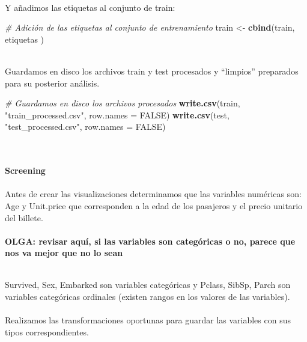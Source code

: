 \documentclass[
]{article}
\newenvironment{Shaded}{\begin{snugshade}}{\end{snugshade}}
\newcommand{\CommentTok}[1]{\textcolor[rgb]{0.56,0.35,0.01}{\textit{#1}}}
\newcommand{\DataTypeTok}[1]{\textcolor[rgb]{0.13,0.29,0.53}{#1}}
\newcommand{\KeywordTok}[1]{\textcolor[rgb]{0.13,0.29,0.53}{\textbf{#1}}}
\newcommand{\NormalTok}[1]{#1}
\newcommand{\OtherTok}[1]{\textcolor[rgb]{0.56,0.35,0.01}{#1}}
\newcommand{\StringTok}[1]{\textcolor[rgb]{0.31,0.60,0.02}{#1}}
\begin{document}
\texttt{}~\\
\texttt{}

Y añadimos las etiquetas al conjunto de train: \texttt{}

\begin{Shaded}
\begin{Highlighting}[]
\CommentTok{# Adición de las etiquetas al conjunto de entrenamiento}
\NormalTok{train <-}\StringTok{ }\KeywordTok{cbind}\NormalTok{(train, etiquetas )}
\end{Highlighting}
\end{Shaded}

\texttt{}\\
Guardamos en disco los archivos train y test procesados y ``limpios''
preparados para su posterior análisis. \texttt{}

\begin{Shaded}
\begin{Highlighting}[]
\CommentTok{# Guardamos en disco los archivos procesados}
\KeywordTok{write.csv}\NormalTok{(train, }\StringTok{"train_processed.csv"}\NormalTok{, }\DataTypeTok{row.names =} \OtherTok{FALSE}\NormalTok{)}
\KeywordTok{write.csv}\NormalTok{(test, }\StringTok{"test_processed.csv"}\NormalTok{, }\DataTypeTok{row.names =} \OtherTok{FALSE}\NormalTok{)}
\end{Highlighting}
\end{Shaded}

\texttt{}\\
\texttt{}~\\
\textbf{Screening}\\
\texttt{}~\\
Antes de crear las visualizaciones determinamos que las variables
numéricas son: Age y Unit.price que corresponden a la edad de los
pasajeros y el precio unitario del billete.\\
\texttt{}~\\
\textbf{OLGA: revisar aquí, si las variables son categóricas o no,
parece que nos va mejor que no lo sean}

\texttt{}\\
Survived, Sex, Embarked son variables categóricas y Pclass, SibSp, Parch
son variables categóricas ordinales (existen rangos en los valores de
las variables).\\
\texttt{}~\\
Realizamos las transformaciones oportunas para guardar las variables con
sus tipos correspondientes.\\
\texttt{}
\end{document}
